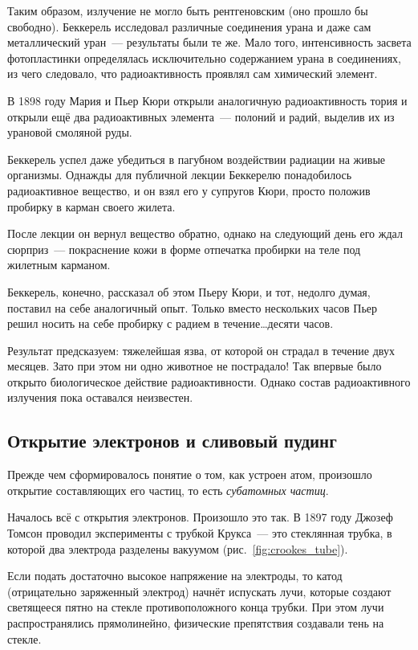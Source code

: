 Таким образом, излучение не могло быть рентгеновским (оно прошло бы свободно). Беккерель исследовал различные соединения урана и даже сам металлический уран~--- результаты были те же. Мало того, интенсивность засвета фотопластинки определялась исключительно содержанием урана в соединениях, из чего следовало, что радиоактивность проявлял сам химический элемент.

В 1898 году Мария и Пьер Кюри открыли аналогичную радиоактивность тория и открыли ещё два радиоактивных элемента~--- полоний и радий, выделив их из урановой смоляной руды.

Беккерель успел даже убедиться в пагубном воздействии радиации на живые организмы. Однажды для публичной лекции Беккерелю понадобилось радиоактивное вещество, и он взял его у супругов Кюри, просто положив пробирку в карман своего жилета.

После лекции он вернул вещество обратно, однако на следующий день его ждал сюрприз~--- покраснение кожи в форме отпечатка пробирки на теле под жилетным карманом.

Беккерель, конечно, рассказал об этом Пьеру Кюри, и тот, недолго думая, поставил на себе аналогичный опыт. Только вместо нескольких часов Пьер решил носить на себе пробирку с радием в течение\ldots десяти часов.

Результат предсказуем: тяжелейшая язва, от которой он страдал в течение двух месяцев. Зато при этом ни одно животное не пострадало! Так впервые было открыто биологическое действие радиоактивности. Однако состав радиоактивного излучения пока оставался неизвестен.

\subsection*{Открытие электронов и сливовый пудинг}

Прежде чем сформировалось понятие о том, как устроен атом, произошло открытие составляющих его частиц, то есть \emph{субатомных частиц}.

Началось всё с открытия электронов. Произошло это так. В 1897 году Джозеф Томсон проводил эксперименты с трубкой Крукса~--- это стеклянная трубка, в которой два электрода разделены вакуумом (рис.~\ref{fig:crookes_tube}).

Если подать достаточно высокое напряжение на электроды, то катод (отрицательно заряженный электрод) начнёт испускать лучи, которые создают светящееся пятно на стекле противоположного конца трубки. При этом лучи распространялись прямолинейно, физические препятствия создавали тень на стекле.

